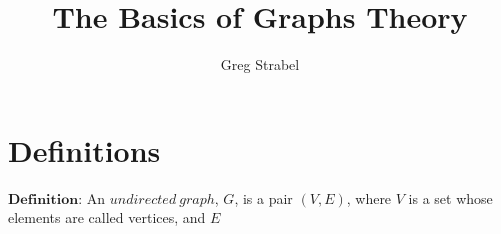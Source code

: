 \documentclass[11pt]{article}
\author{Greg Strabel}
\title{The Basics of Graphs Theory}
\begin{document}
\maketitle
\section{Definitions}
$\mathbf{Definition}$: An $undirected\ graph$, $G$, is a pair $\left( V, E \right)$, where $V$ is a set whose elements are called vertices, and $E$
\end{document}
